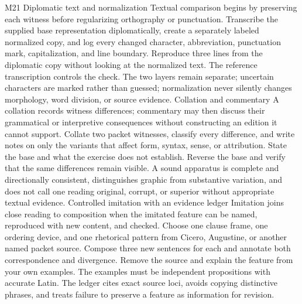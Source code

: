 \begin{courseunit}{M21}
\SubmoduleExtension
  {Diplomatic text and normalization}
  {Textual comparison begins by preserving each witness before regularizing
  orthography or punctuation.}
  {Transcribe the supplied base representation diplomatically, create a
  separately labeled normalized copy, and log every changed character,
  abbreviation, punctuation mark, capitalization, and line boundary.}
  {Reproduce three lines from the diplomatic copy without looking at the
  normalized text.}
  {The reference transcription controls the check.  The two layers remain
  separate; uncertain characters are marked rather than guessed; normalization
  never silently changes morphology, word division, or source evidence.}
\SubmoduleExtension
  {Collation and commentary}
  {A collation records witness differences; commentary may then discuss their
  grammatical or interpretive consequences without constructing an edition it
  cannot support.}
  {Collate two packet witnesses, classify every difference, and write notes on
  only the variants that affect form, syntax, sense, or attribution.  State the
  base and what the exercise does not establish.}
  {Reverse the base and verify that the same differences remain visible.}
  {A sound apparatus is complete and directionally consistent, distinguishes
  graphic from substantive variation, and does not call one reading original,
  corrupt, or superior without appropriate textual evidence.}
\SubmoduleExtension
  {Controlled imitation with an evidence ledger}
  {Imitation joins close reading to composition when the imitated feature can
  be named, reproduced with new content, and checked.}
  {Choose one clause frame, one ordering device, and one rhetorical pattern
  from Cicero, Augustine, or another named packet source.  Compose three new
  sentences for each and annotate both correspondence and divergence.}
  {Remove the source and explain the feature from your own examples.}
  {The examples must be independent propositions with accurate Latin.  The
  ledger cites exact source loci, avoids copying distinctive phrases, and
  treats failure to preserve a feature as information for revision.}
\end{courseunit}


